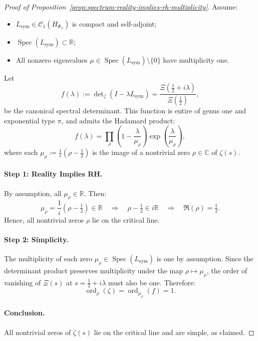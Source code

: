 \begin{proof}[Proof of Proposition~\ref{prop:spectrum-reality-implies-rh-multiplicity}]
Assume:
\begin{itemize}
  \item \( L_{\mathrm{sym}} \in \mathcal{C}_1(H_{\Psi_\alpha}) \) is compact and self-adjoint;
  \item \( \operatorname{Spec}(L_{\mathrm{sym}}) \subset \mathbb{R} \);
  \item All nonzero eigenvalues \( \mu \in \operatorname{Spec}(L_{\mathrm{sym}}) \setminus \{0\} \) have multiplicity one.
\end{itemize}

Let
\[
f(\lambda) := \det\nolimits_\zeta(I - \lambda L_{\mathrm{sym}}) = \frac{\Xi\left(\tfrac{1}{2} + i\lambda\right)}{\Xi\left(\tfrac{1}{2}\right)},
\]
be the canonical spectral determinant. This function is entire of genus one and exponential type \( \pi \), and admits the Hadamard product:
\[
f(\lambda) = \prod_{\rho} \left(1 - \frac{\lambda}{\mu_\rho}\right) \exp\left( \frac{\lambda}{\mu_\rho} \right),
\]
where each \( \mu_\rho := \frac{1}{i}(\rho - \tfrac{1}{2}) \) is the image of a nontrivial zero \( \rho \in \mathbb{C} \) of \( \zeta(s) \).

\paragraph{Step 1: Reality Implies RH.}
By assumption, all \( \mu_\rho \in \mathbb{R} \). Then:
\[
\mu_\rho = \frac{1}{i}(\rho - \tfrac{1}{2}) \in \mathbb{R} \quad \Longrightarrow \quad \rho - \tfrac{1}{2} \in i\mathbb{R} \quad \Longrightarrow \quad \Re(\rho) = \tfrac{1}{2}.
\]
Hence, all nontrivial zeros \( \rho \) lie on the critical line.

\paragraph{Step 2: Simplicity.}
The multiplicity of each zero \( \mu_\rho \in \operatorname{Spec}(L_{\mathrm{sym}}) \) is one by assumption. Since the determinant product preserves multiplicity under the map \( \rho \mapsto \mu_\rho \), the order of vanishing of \( \Xi(s) \) at \( s = \tfrac{1}{2} + i\lambda \) must also be one. Therefore:
\[
\operatorname{ord}_\rho(\zeta) = \operatorname{ord}_{\mu_\rho}(f) = 1.
\]

\paragraph{Conclusion.}
All nontrivial zeros of \( \zeta(s) \) lie on the critical line and are simple, as claimed.
\end{proof}
